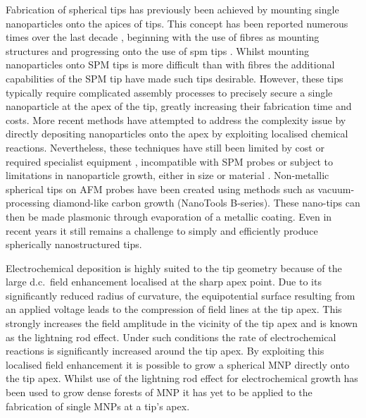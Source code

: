 \documentclass[12pt, a4paper, oneside]{book}
\begin{document}
Fabrication of spherical tips has previously been achieved by mounting single nanoparticles onto the apices of tips. This concept has been reported numerous times over the last decade \cite{gan2007}, beginning with the use of fibres as mounting structures \cite{kalkbrenner2001, barsegova2002, sqalli2002, kawata2003} and progressing onto the use of \gls{spm} tips \cite{umakoshi2012, hayazawa2012, park2012, okamoto2001, vakarelski2006}. Whilst mounting nanoparticles onto SPM tips is more difficult than with fibres the additional capabilities of the SPM tip have made such tips desirable. However, these tips typically require complicated assembly processes to precisely secure a single nanoparticle at the apex of the tip, greatly increasing their fabrication time and costs. More recent methods have attempted to address the complexity issue by directly depositing nanoparticles onto the apex by exploiting localised chemical reactions. Nevertheless, these techniques have still been limited by cost or required specialist equipment \cite{sqalli2002, okamoto2001}, incompatible with SPM probes \cite{kharintsev2013, barsegova2002} or subject to limitations in nanoparticle growth, either in size \cite{cheng2013} or material \cite{umakoshi2012}.
Non-metallic spherical tips on AFM probes have been created using methods such as vacuum-processing diamond-like carbon growth (NanoTools B-series). These nano-tips can then be made plasmonic through evaporation of a metallic coating.
Even in recent years it still remains a challenge to simply and efficiently produce spherically nanostructured tips.

Electrochemical deposition is highly suited to the tip geometry because of the large d.c.\ field enhancement localised at the sharp apex point. Due to its significantly reduced radius of curvature, the equipotential surface resulting from an applied voltage leads to the compression of field lines at the tip apex. This strongly increases the field amplitude in the vicinity of the tip apex and is known as the lightning rod effect. Under such conditions the rate of electrochemical reactions is significantly increased around the tip apex. By exploiting this localised field enhancement it is possible to grow a spherical MNP directly onto the tip apex. Whilst use of the lightning rod effect for electrochemical growth has been used to grow dense forests of MNP \cite{tian2006, yang2011} it has yet to be applied to the fabrication of single MNPs at a tip's apex.
\end{document}
